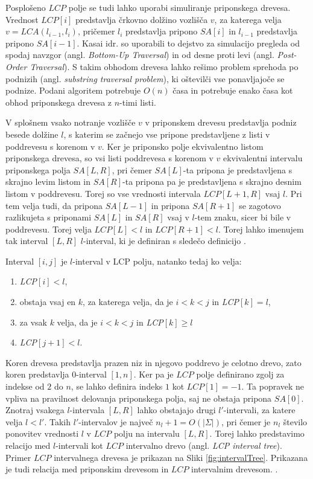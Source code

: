 Posplošeno $LCP$ polje se tudi lahko uporabi simuliranje priponskega drevesa. Vrednost $LCP[i]$ predstavlja črkovno dolžino vozlišča $v$, za katerega velja $v=LCA(l_{i-1},l_i)$, pričemer $l_i$ predstavlja pripono $SA[i]$ in $l_{i-1}$ predstavlja pripono $SA[i-1]$. Kasai idr. \cite{Kasai2001} so uporabili to dejstvo za simulacijo pregleda od spodaj navzgor (angl. \textit{Bottom-Up Traversal}) in od desne proti levi (angl. \textit{Post-Order Traversal}). S takim obhodom drevesa lahko rešimo problem sprehoda po podnizih (angl. \textit{substring traversal problem}), ki oštevilči vse ponavljajoče se podnize. Podani algoritem potrebuje $O(n)$ časa in potrebuje enako časa kot obhod priponskega drevesa z $n$-timi listi.

V splošnem vsako notranje vozlišče $v$ v priponskem drevesu predstavlja podniz besede dolžine $l$, s katerim se začnejo vse pripone predstavljene z listi v poddrevesu s korenom v $v$. Ker je priponsko polje ekvivalentno listom priponskega drevesa, so vsi listi poddrevesa s korenom v $v$ ekvivalentni intervalu priponskega polja $SA[L,R]$, pri čemer $SA[L]$-ta pripona je predstavljena s skrajno levim listom in $SA[R]$-ta pripona pa je predstavljena s skrajno desnim listom v poddrevesu. Torej so vse vrednosti intervala $LCP[L+1,R]$ vsaj $l$. Pri tem velja tudi, da pripona $SA[L-1]$ in pripona $SA[R+1]$ se zagotovo razlikujeta s priponami $SA[L]$ in $SA[R]$ vsaj v $l$-tem znaku, sicer bi bile v poddrevesu. Torej velja $LCP[L]< l$ in $LCP[R+1]< l$. Torej lahko imenujem tak interval $[L,R]$ $l$-interval, ki je definiran s sledečo definicijo \cite{Abouelhoda2004}.
\begin{defi}
    Interval $[i,j]$ je $l$-interval v LCP polju, natanko tedaj ko velja:
    \begin{enumerate}
        \item \textit{LCP}$[i]<l$,
        \item obstaja vsaj en $k$, za katerega velja, da je $i< k< j$ in \textit{LCP}$[k]=l$,
        \item za vsak $k$ velja, da je $i< k< j$ in \textit{LCP}$[k]\ge l$
        \item \textit{LCP}$[j+1]<l$.      
    \end{enumerate}
\end{defi}

Koren drevesa predstavlja prazen niz in njegovo poddrevo je celotno drevo, zato koren predstavlja $0$-interval $[1,n]$. Ker pa je $LCP$ polje definirano zgolj za indekse od $2$ do $n$, se lahko definira indeks $1$ kot $LCP[1]=-1$. Ta popravek ne vpliva na pravilnost delovanja priponskega polja, saj ne obstaja pripona $SA[0]$. Znotraj vsakega $l$-intervala $[L,R]$ lahko obstajajo drugi $l'$-intervali, za katere velja $l<l'$. Takih $l'$-intervalov je največ $n_l+1=O(|\Sigma|)$, pri čemer je $n_l$ število ponovitev vrednosti $l$ v $LCP$ polju na intervalu $[L,R]$. Torej lahko predstavimo relacijo med $l$-intervali kot $LCP$ intervalno drevo (angl. \textit{LCP interval tree}). Primer $LCP$ intervalnega drevesa je prikazan na Sliki \ref{fig:intervalTree}. Prikazana je tudi relacija med priponskim drevesom in $LCP$ intervalnim drevesom. \cite{Abouelhoda2004}.

